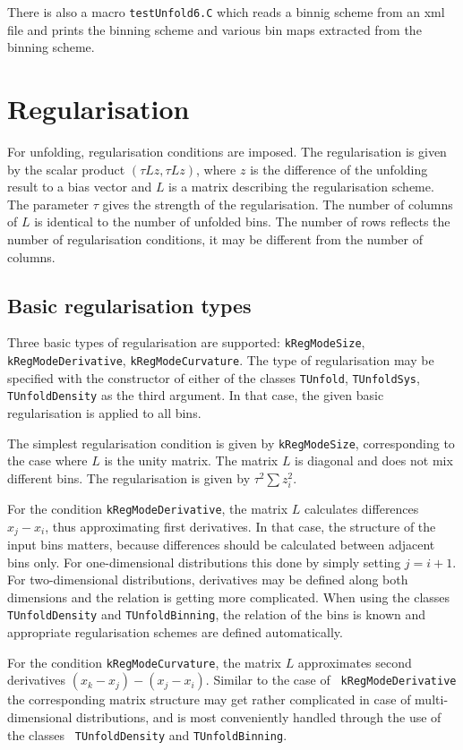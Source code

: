 \documentclass[12pt]{article}
\begin{document}
There is also a macro {\tt testUnfold6.C} which reads a binnig scheme
from an xml file and prints the binning scheme and various bin maps
extracted from the binning scheme.

\section{Regularisation}

For unfolding, regularisation conditions are imposed. The
regularisation is given by the scalar product
$\left(\tau Lz,\tau Lz\right)$, where $z$ is the difference of the unfolding
result to a bias vector and $L$ is a matrix describing the
regularisation scheme. The parameter $\tau$ gives the strength of the
regularisation. The number of columns of $L$ is identical to
the number of unfolded bins. The number of rows reflects the number of
regularisation conditions, it may be different from the number of columns.

\subsection{Basic regularisation types}

Three basic types of regularisation are supported: {\tt kRegModeSize},
{\tt kRegModeDerivative}, {\tt kRegModeCurvature}. The type of
regularisation may be specified with the constructor of either of the
classes {\tt TUnfold}, {\tt TUnfoldSys}, {\tt TUnfoldDensity} as the
third argument. In that case, the given basic regularisation is
applied to all bins.

The simplest regularisation condition is given by {\tt kRegModeSize},
corresponding to the case where $L$ is the unity matrix.
The matrix $L$ is diagonal and does not mix different bins. The
regularisation is given by $\tau^2\sum z_i^2$.

For the condition {\tt kRegModeDerivative}, the matrix $L$
calculates differences $x_j-x_i$, thus approximating first
derivatives. In that case, the structure of the input bins matters,
because differences should be calculated between adjacent bins
only. For one-dimensional distributions this done by simply setting
$j=i+1$. For two-dimensional distributions, derivatives may be defined
along both dimensions and the relation is getting more complicated.
When using the classes {\tt TUnfoldDensity} and {\tt TUnfoldBinning},
the relation of the bins is known and appropriate regularisation schemes are
defined automatically.

For the condition {\tt kRegModeCurvature}, the matrix $L$ approximates
second derivatives $(x_k-x_j)-(x_j-x_i)$. Similar to the case of {\tt
  kRegModeDerivative} the corresponding matrix structure may get
rather complicated in case of multi-dimensional distributions, and is
most conveniently handled through the use of the classes {\tt
  TUnfoldDensity} and {\tt TUnfoldBinning}.
\end{document}

